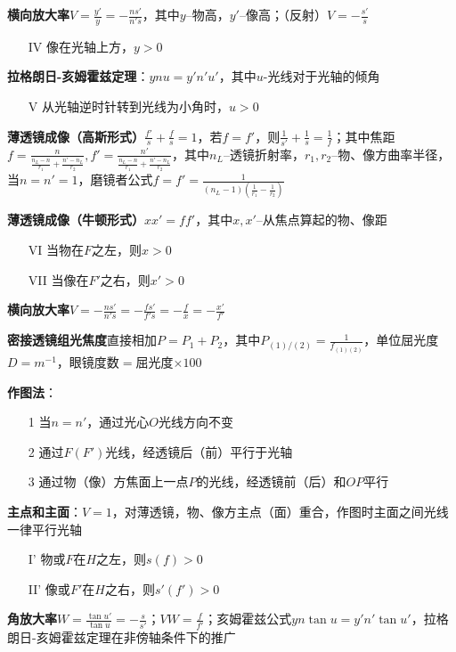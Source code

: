 \documentclass[10pt,a4paper]{article}
\begin{document}
\textbf{横向放大率}$V=\frac{y'}{y}=-\frac{ns'}{n's}$，其中$y$--物高，$y'$--像高；（反射）$V=-\frac{s'}{s}$
\begin{itemize}
  \item[IV] 像在光轴上方，$y>0$
\end{itemize}

\textbf{拉格朗日-亥姆霍兹定理}：$ynu=y'n'u'$，其中$u$-光线对于光轴的倾角
\begin{itemize}
  \item[V] 从光轴逆时针转到光线为小角时，$u>0$
\end{itemize}

\textbf{薄透镜成像（高斯形式）}$\frac{f'}{s}+\frac{f}{s}=1$，若$f=f'$，则$\frac{1}{s'}+\frac{1}{s}=\frac{1}{f}$；其中焦距$f=\frac{n}{\frac{n_L-n}{r_1}+\frac{n'-n_L}{r_2}},f'=\frac{n'}{\frac{n_L-n}{r_1}+\frac{n'-n_L}{r_2}}$，其中$n_L$--透镜折射率，$r_1,r_2$--物、像方曲率半径，当$n=n'=1$，磨镜者公式$f=f'=\frac{1}{(n_L-1)(\frac{1}{r_1}-\frac{1}{r_2})}$

\textbf{薄透镜成像（牛顿形式）}$xx'=ff'$，其中$x,x'$--从焦点算起的物、像距
\begin{itemize}
  \item[VI] 当物在$F$之左，则$x>0$
  \item[VII] 当像在$F'$之右，则$x'>0$
\end{itemize}

\textbf{横向放大率}$V=-\frac{ns'}{n's}=-\frac{fs'}{f's}=-\frac{f}{x}=-\frac{x'}{f'}$

\textbf{密接透镜组光焦度}直接相加$P=P_1+P_2$，其中$P_{(1)/(2)}=\frac{1}{f_{(1)(2)}}$，单位屈光度$D=m^{-1}$，眼镜度数$=$屈光度$\times100$

\textbf{作图法}：
\begin{itemize}
  \item[1] 当$n=n'$，通过光心$O$光线方向不变
  \item[2] 通过$F(F')$光线，经透镜后（前）平行于光轴
  \item[3] 通过物（像）方焦面上一点$P$的光线，经透镜前（后）和$OP$平行
\end{itemize}

\textbf{主点和主面}：$V=1$，对薄透镜，物、像方主点（面）重合，作图时主面之间光线一律平行光轴
\begin{itemize}
  \item[I'] 物或$F$在$H$之左，则$s(f)>0$
  \item[II'] 像或$F'$在$H$之右，则$s'(f')>0$
\end{itemize}

\textbf{角放大率}$W=\frac{\tan u'}{\tan u}=-\frac{s}{s'}$；$VW=\frac{f}{f'}$；亥姆霍兹公式$yn\tan u=y'n'\tan u'$，拉格朗日-亥姆霍兹定理在非傍轴条件下的推广
\end{document}
